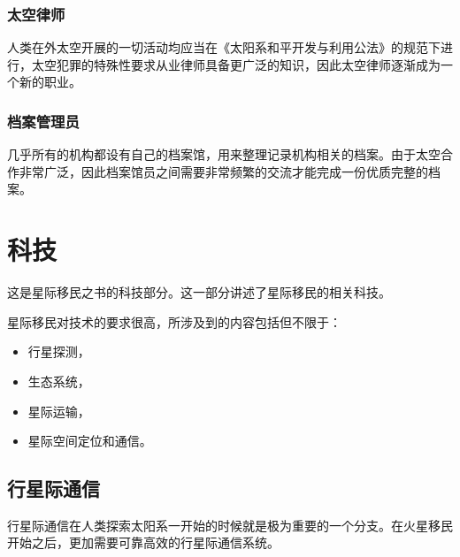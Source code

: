 \documentclass[letterpaper,10pt]{sphinxmanual}
\begin{document}
\subsubsection{太空律师}
\label{profession:id48}
人类在外太空开展的一切活动均应当在《太阳系和平开发与利用公法》的规范下进行，太空犯罪的特殊性要求从业律师具备更广泛的知识，因此太空律师逐渐成为一个新的职业。


\subsubsection{档案管理员}
\label{profession:id49}
几乎所有的机构都设有自己的档案馆，用来整理记录机构相关的档案。由于太空合作非常广泛，因此档案馆员之间需要非常频繁的交流才能完成一份优质完整的档案。


\section{科技}
\label{tech::doc}\label{tech:id1}
这是星际移民之书的科技部分。这一部分讲述了星际移民的相关科技。

星际移民对技术的要求很高，所涉及到的内容包括但不限于：
\begin{itemize}
\item {} 
行星探测，

\item {} 
生态系统，

\item {} 
星际运输，

\item {} 
星际空间定位和通信。

\end{itemize}


\subsection{行星际通信}
\label{tech:id2}
行星际通信在人类探索太阳系一开始的时候就是极为重要的一个分支。在火星移民开始之后，更加需要可靠高效的行星际通信系统。
\end{document}
